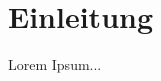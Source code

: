 \documentclass[../Document.tex]{subfiles}
\begin{document}
\section{Einleitung}
Lorem Ipsum...
\end{document}
